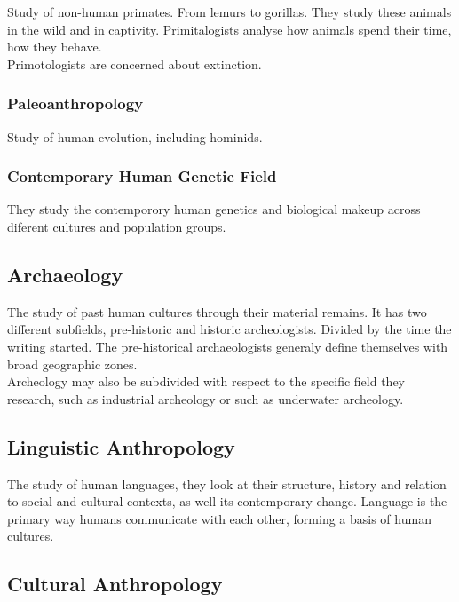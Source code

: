 \documentclass[11pt,a4paper]{book}
\begin{document}
Study of non-human primates. From lemurs to gorillas. They study these animals in the wild and in captivity. Primitalogists analyse how animals spend their time, how they behave.\\

Primotologists are concerned about extinction.

\subsubsection{Paleoanthropology}

Study of human evolution, including hominids.

\subsubsection{Contemporary Human Genetic Field}

They study the contemporory human genetics and biological makeup across diferent cultures and population groups.

\subsection{Archaeology}

The study of past human cultures through their material remains. It has two different subfields, pre-historic and historic archeologists. Divided by the time the writing started. The pre-historical archaeologists generaly define themselves with broad geographic zones.\\

Archeology may also be subdivided with respect to the specific field they research, such as industrial archeology or such as underwater archeology.

\subsection{Linguistic Anthropology}

The study of human languages, they look at their structure, history and relation to social and cultural contexts, as well its contemporary change. Language is the primary way humans communicate with each other, forming a basis of human cultures.

\subsection{Cultural Anthropology}
\end{document}
